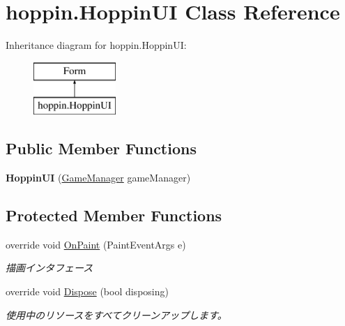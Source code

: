 \hypertarget{classhoppin_1_1_hoppin_u_i}{}\section{hoppin.\+Hoppin\+UI Class Reference}
\label{classhoppin_1_1_hoppin_u_i}
Inheritance diagram for hoppin.\+Hoppin\+UI\+:\begin{figure}[H]
\begin{center}
\leavevmode
\includegraphics[height=2.000000cm]{classhoppin_1_1_hoppin_u_i}
\end{center}
\end{figure}
\subsection*{Public Member Functions}
\begin{DoxyCompactItemize}
\item 
{\bfseries Hoppin\+UI} (\hyperlink{classhoppin_1_1_game_system_1_1_game_manager}{Game\+Manager} game\+Manager)\hypertarget{classhoppin_1_1_hoppin_u_i_a7faed3d0cc7a679dad7800bd1ab6d4a9}{}\label{classhoppin_1_1_hoppin_u_i_a7faed3d0cc7a679dad7800bd1ab6d4a9}

\end{DoxyCompactItemize}
\subsection*{Protected Member Functions}
\begin{DoxyCompactItemize}
\item 
override void \hyperlink{classhoppin_1_1_hoppin_u_i_a4ebb6fb66a82f87ac8c53665958ba151}{On\+Paint} (Paint\+Event\+Args e)
\begin{DoxyCompactList}\small\item\em 描画インタフェース \end{DoxyCompactList}\item 
override void \hyperlink{classhoppin_1_1_hoppin_u_i_a6bb97d2a8631997b34eb333080958c23}{Dispose} (bool disposing)
\begin{DoxyCompactList}\small\item\em 使用中のリソースをすべてクリーンアップします。 \end{DoxyCompactList}\end{DoxyCompactItemize}


